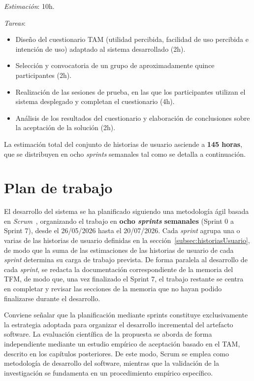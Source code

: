 {\textit{Estimación}: 10h.

\textit{Tareas}:
\begin{itemize}
    \item Diseño del cuestionario TAM (utilidad percibida, facilidad de uso percibida e intención de uso) adaptado al sistema desarrollado (2h).
    \item Selección y convocatoria de un grupo de aproximadamente quince participantes (2h).
    \item Realización de las sesiones de prueba, en las que los participantes utilizan el sistema desplegado y completan el cuestionario (4h).
    \item Análisis de los resultados del cuestionario y elaboración de conclusiones sobre la aceptación de la solución (2h).
\end{itemize}

La estimación total del conjunto de historias de usuario asciende a \textbf{145 horas}, que se distribuyen en ocho \textit{sprints} semanales tal como se detalla a continuación.

\section{Plan de trabajo}
\label{sec:planTrabajo}

El desarrollo del sistema se ha planificado siguiendo una metodología ágil basada en \textit{Scrum}~\cite{riano2021}, organizando el trabajo en \textbf{ocho \textit{sprints} semanales} (Sprint 0 a Sprint 7), desde el 26/05/2026 hasta el 20/07/2026. Cada \textit{sprint} agrupa una o varias de las historias de usuario definidas en la sección~\ref{subsec:historiasUsuario}, de modo que la suma de las estimaciones de las historias de usuario de cada \textit{sprint} determina su carga de trabajo prevista. De forma paralela al desarrollo de cada \textit{sprint}, se redacta la documentación correspondiente de la memoria del TFM, de modo que, una vez finalizado el Sprint 7, el trabajo restante se centra en completar y revisar las secciones de la memoria que no hayan podido finalizarse durante el desarrollo.

Conviene señalar que la planificación mediante sprints constituye exclusivamente la estrategia adoptada para organizar el desarrollo incremental del artefacto software. La evaluación científica de la propuesta se aborda de forma independiente mediante un estudio empírico de aceptación basado en el TAM, descrito en los capítulos posteriores. De este modo, Scrum se emplea como metodología de desarrollo del software, mientras que la validación de la investigación se fundamenta en un procedimiento empírico específico.

}
